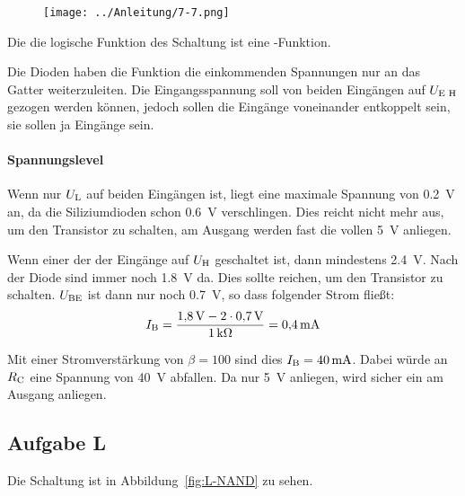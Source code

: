 \begin{figure}[htbp]
	\centering
	\texttt{[image: ../Anleitung/7-7.png]}
	\caption{%
		\cite[Abbildung~7.7]{physik313-Anleitung}
	}
	\label{fig:7-7}
\end{figure}

Die die logische Funktion des Schaltung ist eine \tnor-Funktion.

Die Dioden
haben die Funktion die einkommenden Spannungen nur an das Gatter
weiterzuleiten. Die Eingangsspannung soll von beiden Eingängen auf $\UEH$
gezogen werden können, jedoch sollen die Eingänge voneinander entkoppelt sein,
sie sollen ja Eingänge sein.

\paragraph{Spannungslevel}

Wenn nur $\UL$ auf beiden Eingängen ist, liegt eine maximale Spannung von
\SI{.2}{\volt} an, da die Siliziumdioden schon \SI{.6}{\volt} verschlingen.
Dies reicht nicht mehr aus, um den Transistor zu schalten, am Ausgang werden
fast die vollen \SI{5}{\volt} anliegen.

Wenn einer der der Eingänge auf $\UH$ geschaltet ist, dann mindestens
\SI{2.4}{\volt}. Nach der Diode sind immer noch \SI{1.8}{\volt} da. Dies sollte
reichen, um den Transistor zu schalten. $\UBE$ ist dann nur noch
\SI{.7}{\volt}, so dass folgender Strom fließt:
\[
	\IB = \frac{\SI{1.8}\volt - 2 \cdot \SI{.7}\volt}{\SI1{\kilo\ohm}}
	= \SI{.4}{\milli\ampere}
\]

Mit einer Stromverstärkung von $\beta = 100$ sind dies $\IB =
\SI{40}{\milli\ampere}$. Dabei würde an $\RC$ eine Spannung von \SI{40}{\volt}
abfallen. Da nur \SI{5}{\volt} anliegen, wird sicher ein \tlow{} am Ausgang
anliegen.

\FloatBarrier
\subsection{Aufgabe L}


Die Schaltung ist in Abbildung~\ref{fig:L-NAND} zu sehen. 

